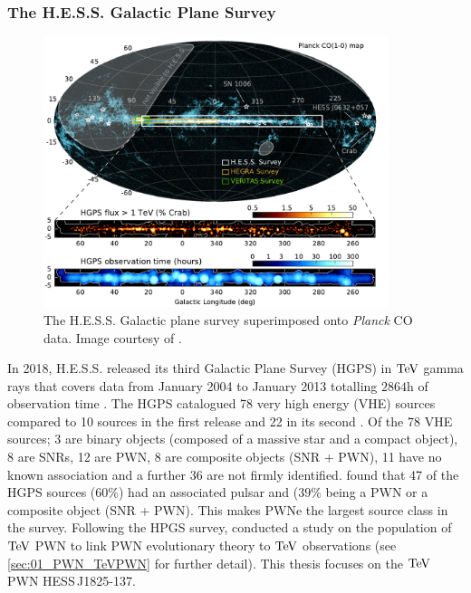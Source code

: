 \subsubsection{The H.E.S.S. Galactic Plane Survey}

\begin{figure}[h]
    \centering
    \includegraphics[width=0.9\textwidth]{05_Astronomy/Images/telescopes/hess_survey.pdf}
    \caption{The H.E.S.S. Galactic plane survey superimposed onto \textit{Planck} CO data. Image courtesy of \cite{2018A&A...612A...1H}.}
    \label{fig:chapter_2_HESS_survey}
\end{figure}

In 2018, H.E.S.S. released its third Galactic Plane Survey (HGPS) in $\TeV$ gamma rays that covers data from January 2004 to January 2013 totalling $2864\si{\hour}$ of observation time \citep{2018A&A...612A...1H}. The HGPS catalogued 78 very high energy (VHE) sources compared to 10 sources in the first release \citep{2005Sci...307.1938A} and  22 in its second \citep{2006ApJ...636..777A}. Of the 78 VHE sources; 3 are binary objects (composed of a massive star and a compact object), 8 are SNRs, 12 are PWN, 8 are composite objects (SNR + PWN), 11 have no known association and a further 36 are not firmly identified. \cite{2018A&A...612A...1H} found that 47 of the HGPS sources ($60\%$) had an associated pulsar and ($39\%$ being a PWN or a composite object (SNR + PWN). This makes PWNe the largest source class in the survey. Following the HPGS survey, \cite{2018A&A...612A...2H} conducted a study on the population of $\TeV$ PWN to link PWN evolutionary theory to $\TeV$ observations (see \autoref{sec:01_PWN_TeVPWN} for further detail). This thesis focuses on the $\TeV$ PWN \mbox{HESS\,J1825-137}.

